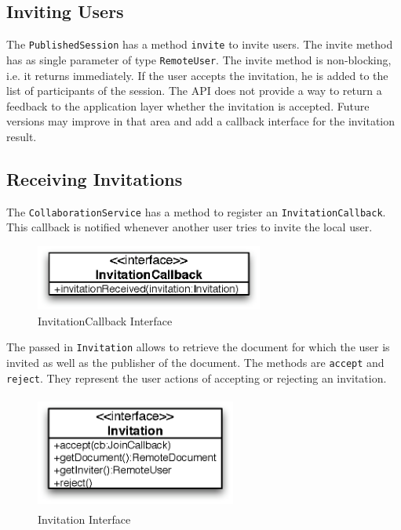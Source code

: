 \subsection{Inviting Users}
\label{sect:archoverview.invitingusers}
The \texttt{PublishedSession} has a method \texttt{invite} to invite users.
The invite method has as single parameter of type \texttt{RemoteUser}. 
The invite method is non-blocking, i.e. it
returns immediately. If the user accepts the invitation, he is added to the
list of participants of the session. The API does not provide a way to return
a feedback to the application layer whether the invitation is accepted.
Future versions may improve in that area and add a callback interface for
the invitation result.


\subsection{Receiving Invitations}
The \texttt{CollaborationService} has a method to register an
\texttt{InvitationCallback}. This callback is notified whenever another user
tries to invite the local user. 

\begin{figure}[H]
 \centering
 \includegraphics[width=7.48cm,height=2.15cm]{../images/finalreport/architecture_invitationcallback_uml.eps}
 \caption{InvitationCallback Interface}
\end{figure}

The passed in \texttt{Invitation} allows to retrieve the document for which
the user is invited as well as the publisher of the document. The
methods are \texttt{accept} and \texttt{reject}. They represent
the user actions of accepting or rejecting an invitation. 

\begin{figure}[H]
 \centering
 \includegraphics[width=6.60cm,height=3.76cm]{../images/finalreport/architecture_invitation_uml.eps}
 \caption{Invitation Interface}
\end{figure}

